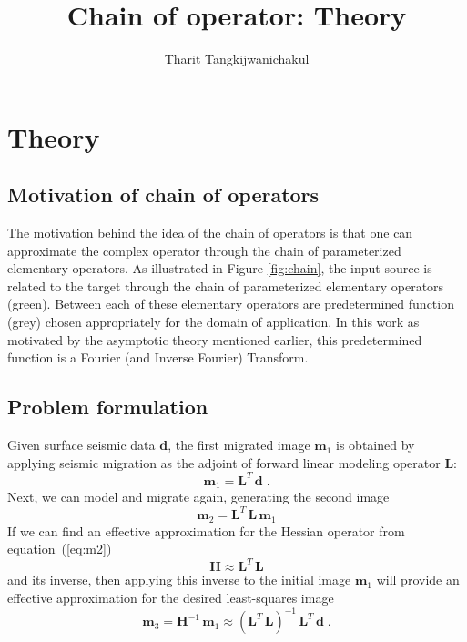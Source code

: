\title{Chain of operator: Theory}
\author{Tharit Tangkijwanichakul}
\label{ch:chapter-background}
\maketitle
{}

\newcommand\inv[1]{#1\raisebox{1.15ex}{$\scriptscriptstyle-\!1$}} %



\section{Theory}


\subsection{Motivation of chain of operators}


The motivation behind the idea of the chain of operators is that one can approximate the complex operator through the chain of parameterized elementary operators. As illustrated in Figure \ref{fig:chain}, the input source is related to the target through the chain of parameterized elementary operators (green). Between each of these elementary operators are predetermined function (grey) chosen appropriately for the domain of application. In this work as motivated by the asymptotic theory mentioned earlier, this predetermined function is a Fourier (and Inverse Fourier) Transform.

\subsection*{Problem formulation}
Given surface seismic data $\mathbf{d}$, the first migrated image $\mathbf{m}_1$ is obtained by applying seismic migration as the adjoint of forward linear modeling operator $\mathbf{L}$:
\begin{equation}
\label{eq:m1}
    \mathbf{m}_1=\mathbf{L}^{T}\,\mathbf{d}\;.
\end{equation}
Next, we can model and migrate again, generating the second image
\begin{equation}
\label{eq:m2}
    \mathbf{m}_2=\mathbf{L}^{T}\,\mathbf{L\,m}_1
\end{equation}
If we can find an effective approximation for the Hessian operator from equation~(\ref{eq:m2})
\begin{equation}
\label{eq:hessian}
    \mathbf{H} \approx \mathbf{L}^{T}\,\mathbf{L}
\end{equation}
and its inverse, then applying this inverse to the initial image $\mathbf{m}_1$ will provide an effective approximation for the desired least-squares image
\begin{equation}
\label{eq:m3}
    \mathbf{m}_3=\mathbf{H}^{-1}\,\mathbf{m}_1 
    \approx \left(\mathbf{L}^{T}\,\mathbf{L}\right)^{-1}\,\mathbf{L}^{T}\,\mathbf{d}\;.
\end{equation}

